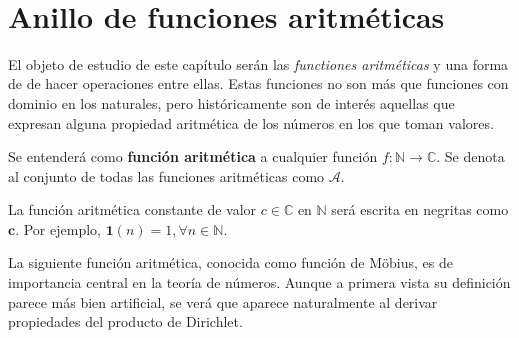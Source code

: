 \newpage
\thispagestyle{empty}
\
\newpage
{}
\section{Anillo de funciones aritméticas}

\vspace{-10pt}
\begin{figure}[h]
\centering
\label{fig:phi}
\end{figure}

\vspace{20pt}

El objeto de estudio de este capítulo serán las \emph{functiones aritméticas} y una forma de de hacer operaciones entre ellas. Estas funciones no son más que funciones con dominio en los naturales, pero históricamente son de interés aquellas que expresan alguna propiedad aritmética de los números en los que toman valores.

\begin{definition}
Se entenderá como \textbf{función aritmética} a cualquier función $f : \mathbb{N} \longrightarrow \mathbb{C}$. Se denota al conjunto de todas las funciones aritméticas como $\mathcal{A}$.
\end{definition}

\begin{definition}
La función aritmética constante de valor $c \in \mathbb{C}$ en $\mathbb{N}$ será escrita en negritas como $\mathbf{c}$. Por ejemplo, $\mathbf{1}(n)=1, \forall n \in \mathbb{N}$.
\end{definition}

La siguiente función aritmética, conocida como función de Möbius, es de importancia central en la teoría de números. Aunque a primera vista su definición parece más bien artificial, se verá que aparece naturalmente al derivar propiedades del producto de Dirichlet.

